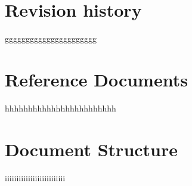 \section{Revision history}
\label{sec:revision_history}%
gggggggggggggggggggggg

\section{Reference Documents}
\label{sec:reference_documents}%
hhhhhhhhhhhhhhhhhhhhhhhh

\section{Document Structure}
\label{sec:document_structure}%
iiiiiiiiiiiiiiiiiiiiiiiiii
